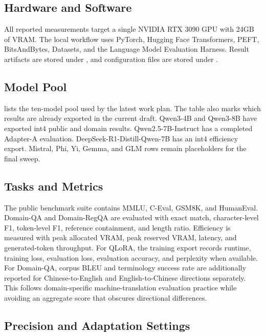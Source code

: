 \label{sec:experimental_setup}

\subsection{Hardware and Software}

All reported measurements target a single NVIDIA RTX 3090 GPU with 24GB of
VRAM. The local workflow uses PyTorch, Hugging Face Transformers, PEFT,
BitsAndBytes, Datasets, and the Language Model Evaluation Harness. Result
artifacts are stored under , and configuration
files are stored under .

\subsection{Model Pool}

 lists the ten-model pool used by the latest work
plan. The table also marks which results are already exported in the current
draft. Qwen3-4B and Qwen3-8B have exported int4 public and domain results.
Qwen2.5-7B-Instruct has a completed Adapter-A evaluation.
DeepSeek-R1-Distill-Qwen-7B has an int4 efficiency export. Mistral, Phi, Yi,
Gemma, and GLM rows remain placeholders for the final sweep.



\subsection{Tasks and Metrics}

The public benchmark suite contains MMLU, C-Eval, GSM8K, and HumanEval.
Domain-QA and Domain-RegQA are evaluated with exact match, character-level F1,
token-level F1, reference containment, and length ratio. Efficiency is measured
with peak allocated VRAM, peak reserved VRAM, latency, and generated-token
throughput. For QLoRA, the training export records runtime, training loss,
evaluation loss, evaluation accuracy, and perplexity when available.
For Domain-QA, corpus BLEU and terminology success rate are additionally
reported for Chinese-to-English and English-to-Chinese directions separately.
This follows domain-specific machine-translation evaluation practice while
avoiding an aggregate score that obscures directional differences.

\subsection{Precision and Adaptation Settings}

